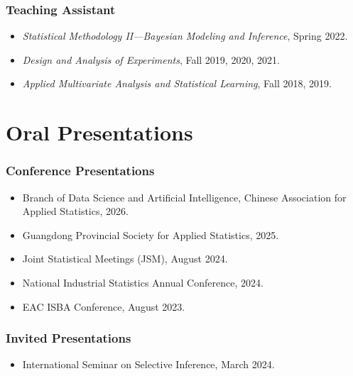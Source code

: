 \documentclass[letterpaper,11pt]{article}
\begin{document}
\subsubsection*{Teaching Assistant}
\begin{itemize}[leftmargin=0.15in, label={}]
    \item \textit{Statistical Methodology II---Bayesian Modeling and Inference}, Spring 2022.
    \item \textit{Design and Analysis of Experiments}, Fall 2019, 2020, 2021.
    \item \textit{Applied Multivariate Analysis and Statistical Learning}, Fall 2018, 2019.
\end{itemize}

\section{Oral Presentations}
\subsubsection*{Conference Presentations}
\begin{itemize}[leftmargin=0.15in, label={}]
    \item Branch of Data Science and Artificial Intelligence, Chinese Association for Applied Statistics, 2026.
    \item Guangdong Provincial Society for Applied Statistics, 2025.
    \item Joint Statistical Meetings (JSM), August 2024.
    \item National Industrial Statistics Annual Conference, 2024.
    \item EAC ISBA Conference, August 2023.
\end{itemize}

\subsubsection*{Invited Presentations}
\begin{itemize}[leftmargin=0.15in, label={}]
    \item International Seminar on Selective Inference, March 2024.
\end{itemize}
\end{document}
